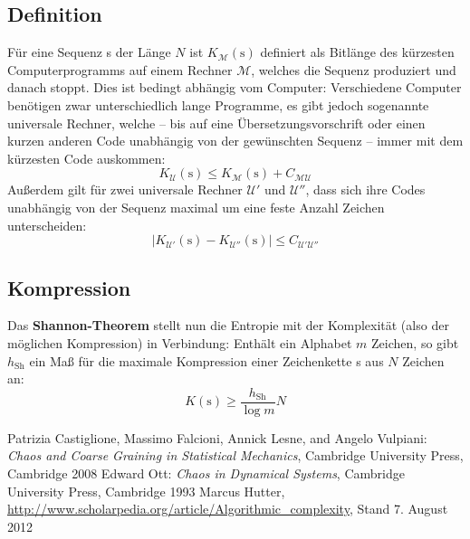 \documentclass[a4paper]{scrartcl}
\begin{document}
\subsection{Definition}
F\"ur eine Sequenz s der L\"ange $N$ ist $K_{\mathcal{M}}\left( \text{s} \right)$ definiert als Bitl\"ange des k\"urzesten Computerprogramms auf einem Rechner $\mathcal{M}$, welches die Sequenz produziert und danach stoppt. Dies ist bedingt abh\"angig vom Computer: Verschiedene Computer ben\"otigen zwar unterschiedlich lange Programme, es gibt jedoch sogenannte \glqq universale Rechner\grqq , welche -- bis auf eine \"Ubersetzungsvorschrift oder einen kurzen anderen Code unabh\"angig von der gew\"unschten Sequenz -- immer mit dem k\"urzesten Code auskommen: 
\[ K_{\mathcal{U}} \left( \text{s} \right) \leq K_{\mathcal{M}} \left( \text{s} \right) + C_{\mathcal{M U}}
\]
Au\ss{}erdem gilt f\"ur zwei universale Rechner $\mathcal{U}'$ und $\mathcal{U}''$, dass sich ihre Codes unabh\"angig von der Sequenz maximal um eine feste Anzahl Zeichen unterscheiden:
\[
  \left| K_{\mathcal{U}'} \left( \text{s} \right) - K_{\mathcal{U}''} \left( \text{s} \right)\right| \leq C_{\mathcal{U}'{\mathcal{U}''}}
\]

\subsection{Kompression}
\label{Kompression}
Das \textbf{Shannon-Theorem} stellt nun die Entropie mit der Komplexit\"at (also der m\"oglichen Kompression) in Verbindung: Enth\"alt ein Alphabet $m$ Zeichen, so gibt $h_{\text{Sh}}$ ein Ma\ss{} f\"ur die maximale Kompression einer Zeichenkette s aus $N$ Zeichen an:
\[ K \left(\text{s}\right) \geq \frac{h_{\text{Sh}}}{\log m} N \]

\begin{thebibliography}{}
   Patrizia Castiglione, Massimo Falcioni, Annick Lesne, and Angelo Vulpiani: \emph{Chaos and Coarse Graining in Statistical Mechanics}, Cambridge University Press, Cambridge 2008
   Edward Ott: \emph{Chaos in Dynamical Systems}, Cambridge University Press, Cambridge 1993
   Marcus Hutter, \url{http://www.scholarpedia.org/article/Algorithmic_complexity}, Stand 7. August 2012
\end{thebibliography}
\end{document}
